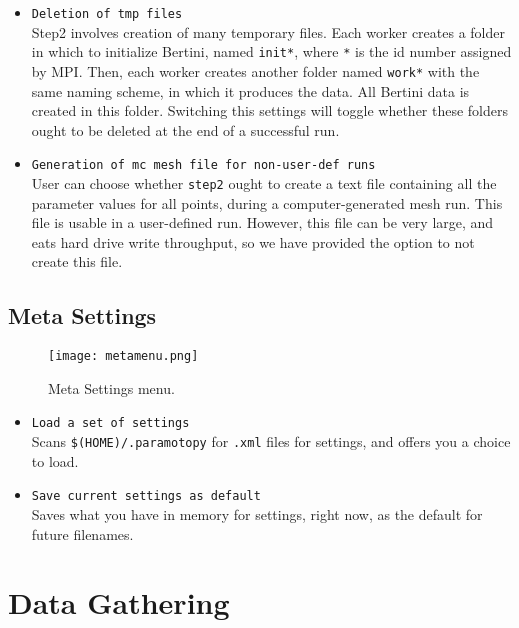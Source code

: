\begin{itemize}
	\item \texttt{Deletion of tmp files} \\ Step2 involves creation of many temporary files.  Each worker creates a folder in which to initialize Bertini, named \texttt{init*}, where \texttt{*} is the id number assigned by MPI.  Then, each worker creates another folder named \texttt{work*} with the same naming scheme, in which it produces the data.  All Bertini data is created in this folder.  Switching this settings will toggle whether these folders ought to be deleted at the end of a successful run.
	
	\item \texttt{Generation of mc mesh file for non-user-def runs} \\ User can choose whether \texttt{step2} ought to create a text file containing all the parameter values for all points, during a computer-generated mesh run.  This file is usable in a user-defined run.  However, this file can be very large, and eats hard drive write throughput, so we have provided the option to not create this file.
	
	
\end{itemize}


\subsection{Meta Settings}
\label{sec:meta}

\begin{figure}[h]
\begin{center}
\texttt{[image: metamenu.png]}
\caption[Meta Menu]{Meta Settings menu.}
\label{screen:metamenu}
\end{center}
\end{figure}


\begin{itemize}
	\item {\tt Load a set of settings} \\ Scans {\tt \$(HOME)/.paramotopy} for {\tt .xml} files for settings, and offers you a choice to load.
	\item {\tt Save current settings as default} \\ Saves what you have in memory for settings, right now, as the default for future filenames.
\end{itemize}

\clearpage
\section{Data Gathering}
\label{sec:data}

